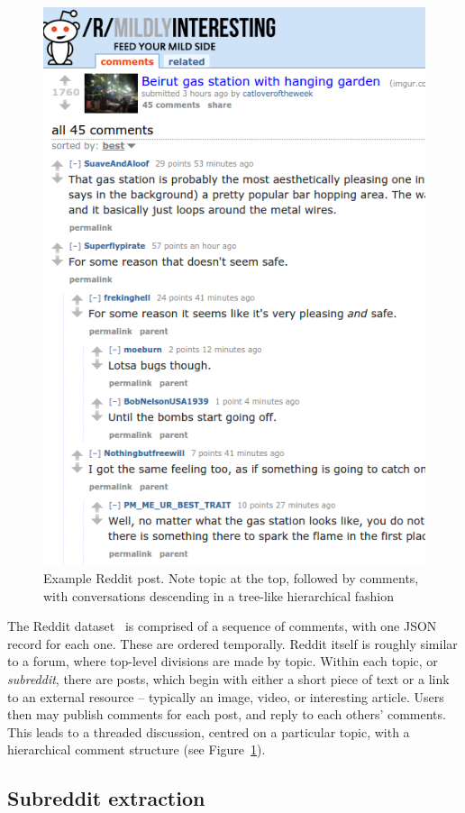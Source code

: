 \documentclass[10pt,journal,compsoc]{IEEEtran}
\begin{document}
\begin{figure}
\centering
\label{fig:reddit-example}
\includegraphics[width=0.7\columnwidth]{reddit-example.png}
\caption{Example Reddit post. Note topic at the top, followed by comments, with conversations descending in a tree-like hierarchical fashion}
\end{figure}

The Reddit dataset~\cite{reddit-data} is comprised of a sequence of comments, with one JSON record for each one.
These are ordered temporally.
Reddit itself is roughly similar to a forum, where top-level divisions are made by topic.
Within each topic, or {\em subreddit}, there are posts, which begin with either a short piece of text or a link to an external resource -- typically an image, video, or interesting article.
Users then may publish comments for each post, and reply to each others' comments.
This leads to a threaded discussion, centred on a particular topic, with a hierarchical comment structure (see Figure~\ref{fig:reddit-example}).


\subsection{Subreddit extraction}
\end{document}
